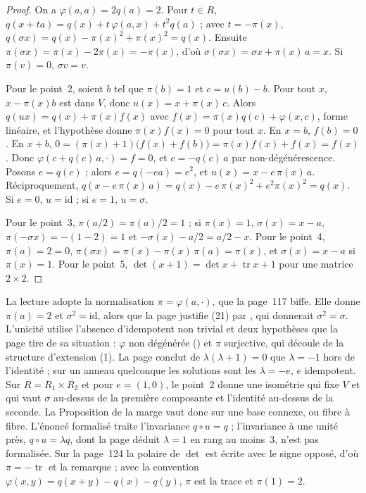 \begin{proof}
On a $\varphi(a, a) = 2q(a) = 2$. Pour $t \in R$, $q(x + ta) = q(x) + t\,\varphi(a, x) + t^2 q(a)$ ; avec $t = -\pi(x)$, $q(\sigma x) = q(x) - \pi(x)^2 + \pi(x)^2 = q(x)$. Ensuite $\pi(\sigma x) = \pi(x) - 2\pi(x) = -\pi(x)$, d'où $\sigma(\sigma x) = \sigma x + \pi(x)\,a = x$. Si $\pi(v) = 0$, $\sigma v = v$.

Pour le point~2, soient $b$ tel que $\pi(b) = 1$ et $c = u(b) - b$. Pour tout $x$, $x - \pi(x) b$ est dans $V$, donc $u(x) = x + \pi(x)\,c$. Alors $q(u x) = q(x) + \pi(x) f(x)$ avec $f(x) = \pi(x) q(c) + \varphi(x, c)$, forme linéaire, et l'hypothèse donne $\pi(x) f(x) = 0$ pour tout $x$. En $x = b$, $f(b) = 0$. En $x + b$, $0 = (\pi(x) + 1)\bigl(f(x) + f(b)\bigr) = \pi(x) f(x) + f(x) = f(x)$. Donc $\varphi(c + q(c)\,a, \cdot) = f = 0$, et $c = -q(c)\,a$ par non-dégénérescence. Posons $e = q(c)$ ; alors $e = q(-e a) = e^2$, et $u(x) = x - e\,\pi(x)\,a$. Réciproquement, $q(x - e\,\pi(x)\,a) = q(x) - e\,\pi(x)^2 + e^2 \pi(x)^2 = q(x)$. Si $e = 0$, $u = \mathrm{id}$ ; si $e = 1$, $u = \sigma$.

Pour le point~3, $\pi(a/2) = \pi(a)/2 = 1$ ; si $\pi(x) = 1$, $\sigma(x) = x - a$, $\pi(-\sigma x) = -(1 - 2) = 1$ et $-\sigma(x) - a/2 = a/2 - x$. Pour le point~4, $\pi(a) = 2 = 0$, $\pi(\sigma x) = \pi(x) - \pi(x)\,\pi(a) = \pi(x)$, et $\sigma(x) = x - a$ si $\pi(x) = 1$. Pour le point~5, $\det(x + 1) = \det x + \operatorname{tr} x + 1$ pour une matrice $2 \times 2$.
\end{proof}

\begin{remarque}
La lecture adopte la normalisation $\pi = \varphi(a, \cdot)$, que la page~117 biffe. Elle donne $\pi(a) = 2$ et $\sigma^2 = \mathrm{id}$, alors que la page justifie (21) par , qui donnerait $\sigma^2 = \sigma$. L'unicité utilise l'absence d'idempotent non trivial et deux hypothèses que la page tire de sa situation : $\varphi$ non dégénérée () et $\pi$ surjective, qui découle de la structure d'extension (1). La page conclut de $\lambda(\lambda + 1) = 0$ que $\lambda = -1$ hors de l'identité ; sur un anneau quelconque les solutions sont les $\lambda = -e$, $e$ idempotent. Sur $R = R_1 \times R_2$ et pour $e = (1, 0)$, le point~2 donne une isométrie qui fixe $V$ et qui vaut $\sigma$ au-dessus de la première composante et l'identité au-dessus de la seconde. La Proposition de la marge vaut donc sur une base connexe, ou fibre à fibre. L'énoncé formalisé traite l'invariance $q \circ u = q$ ; l'invariance à une unité près, $q \circ u = \lambda q$, dont la page déduit $\lambda = 1$ en rang au moins~$3$, n'est pas formalisée. Sur la page~124 la polaire de $\det$ est écrite avec le signe opposé, d'où $\pi = -\operatorname{tr}$ et la remarque  ; avec la convention $\varphi(x, y) = q(x + y) - q(x) - q(y)$, $\pi$ est la trace et $\pi(1) = 2$.
\end{remarque}

